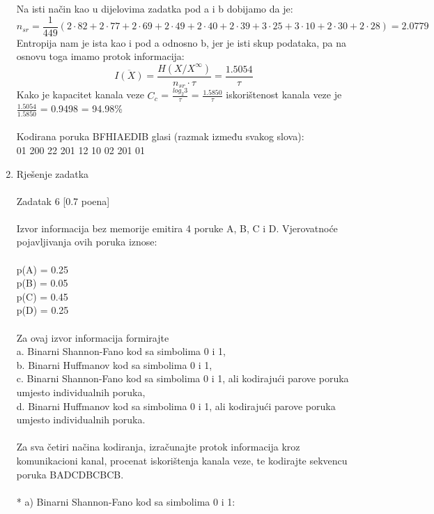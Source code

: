 \documentclass[12pt]{article}
\begin{document}
\begin{enumerate}
Na isti način kao u dijelovima zadatka pod a i b dobijamo da je:
\begin{equation*}
    n_{sr} = \frac{1}{449}(2 \cdot 82 + 2 \cdot 77 + 2 \cdot 69 + 2 \cdot 49 + 2 \cdot 40 +
    2 \cdot 39 + 3 \cdot 25 + 3 \cdot 10 + 2 \cdot 30 + 2 \cdot 28) = 2.0779
\end{equation*}
Entropija nam je ista kao i pod a odnosno b, jer je isti skup podataka, pa na osnovu toga imamo protok informacija:
\begin{equation*}
    \overline{I(X)} = \frac{H(X/X^\infty)}{n_{sr} \cdot \tau} = \frac{1.5054}{\tau}
\end{equation*}
Kako je kapacitet kanala veze $C_c$ = ${\frac{log_2 3}{\tau}}$ = ${\frac{1.5850}{\tau}}$ iskorištenost kanala veze je \\ ${\frac{1.5054}{1.5850}}$ = 0.9498 = 94.98\% \\
\\
Kodirana poruka BFHIAEDIB glasi (razmak između svakog slova): \\
01 200 22 201 12 10 02 201 01 
\newpage
		\item Rješenje zadatka \\
		\\
		Zadatak 6 [0.7 poena] \\
        \\
Izvor informacija bez memorije emitira 4 poruke A, B, C i D. Vjerovatnoće pojavljivanja ovih poruka iznose:
\\
\\
p(A) = 0.25 \\
p(B) = 0.05 \\
p(C) = 0.45 \\
p(D) = 0.25 \\
\\
Za ovaj izvor informacija formirajte \\
a. Binarni Shannon-Fano kod sa simbolima 0 i 1, \\
b. Binarni Huffmanov kod sa simbolima 0 i 1, \\
c. Binarni Shannon-Fano kod sa simbolima 0 i 1, ali kodirajući parove poruka umjesto individualnih poruka, \\
d. Binarni Huffmanov kod sa simbolima 0 i 1, ali kodirajući parove poruka umjesto individualnih poruka. \\
\\
Za sva četiri načina kodiranja, izračunajte protok informacija kroz komunikacioni kanal, procenat iskorištenja kanala veze, te kodirajte sekvencu poruka BADCDBCBCB. \\
\\
* a) Binarni Shannon-Fano kod sa simbolima 0 i 1: 
\\


\end{enumerate}
\end{document}
